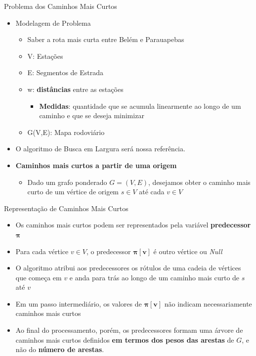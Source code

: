 \documentclass[xcolor=table]{beamer}
\begin{document}
\begin{frame}{Problema dos Caminhos Mais Curtos}
  \begin{itemize}
    \item Modelagem de Problema
    \begin{itemize}
      \item Saber a rota mais curta entre Belém e Parauapebas
      \item V: Estações
      \item E: Segmentos de Estrada
      \item w: \textbf{distâncias} entre as estações
      \begin{itemize}
        \item \textbf{Medidas}: quantidade que se acumula linearmente ao longo de um caminho e que se deseja minimizar
      \end{itemize}
      \item G(V,E): Mapa rodoviário
    \end{itemize}
    \item O algoritmo de Busca em Largura será nossa referência.
    \item \textbf{Caminhos mais curtos a partir de uma origem}
    \begin{itemize}
      \item Dado um grafo ponderado $G = (V,E)$, desejamos obter o caminho mais curto de um vértice de origem $s \in V$ até cada $v \in V$
    \end{itemize}
  \end{itemize}
\end{frame}

\begin{frame}{Representação de Caminhos Mais Curtos}
  \begin{itemize}
    \item Os caminhos mais curtos podem ser representados pela variável \textbf{predecessor} $\boldsymbol{\pi}$
    \item Para cada vértice $v \in V$, o predecessor $\boldsymbol{\pi}[\mathbf{v}]$ é outro vértice ou \textit{Null}
    \item O algoritmo atribui aos predecessores os rótulos de uma cadeia de vértices que começa em $v$ e anda para trás ao longo de um caminho mais curto de $s$ até $v$
    \item Em um passo intermediário, os valores de $\boldsymbol{\pi}[\mathbf{v}]$ não indicam necessariamente caminhos mais curtos
    \item Ao final do processamento, porém, os predecessores formam uma árvore de caminhos mais curtos definidos \textbf{em termos dos pesos das arestas} de $G$, e não do \textbf{número de arestas}.
  \end{itemize}
\end{frame}
\end{document}
